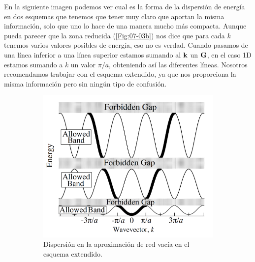 En la siguiente imagen podemos ver cual es la forma de la dispersión de energía en dos esquemas que tenemos que tener muy claro que aportan la misma información, solo que uno lo hace de una manera mucho más compacta. Aunque pueda parecer que la zona reducida (\ref{Fig:07-03b}) nos dice que para cada $k$ tenemos varios valores posibles de energía, eso no es verdad. Cuando pasamos de una línea inferior a una línea superior estamos sumando al $\mathbf{k}$ un $\mathbf{G}$, en el caso 1D estamos sumando a $k$ un valor $\pi/a$, obteniendo así las diferentes líneas. Nosotros recomendamos trabajar con el esquema extendido, ya que nos proporciona la misma información pero sin ningún tipo de confusión.

\begin{figure}[h!] \centering
\begin{subfigure}{0.45\linewidth} \centering 
\includegraphics[scale=0.29]{Cuerpo/Ch_07/Oxford-03.png}
\caption{Dispersión en la aproximación de red vacía en el esquema extendido.}
\label{Fig:07-03a}
\end{subfigure} 
\begin{subfigure}{0.45\linewidth} \centering

\end{subfigure}
\end{figure}
